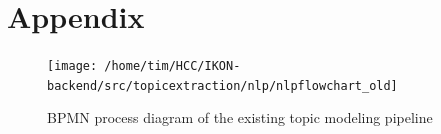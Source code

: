 %

\chapter{Appendix}
\label{ch:Appendix}

\begin{figure}[t]
	\centering
	\texttt{[image: /home/tim/HCC/IKON-backend/src/topicextraction/nlp/nlpflowchart\_old]}
	\caption{\label{pic:IKON_pipeline} BPMN process diagram of the existing topic modeling pipeline}
\end{figure}

